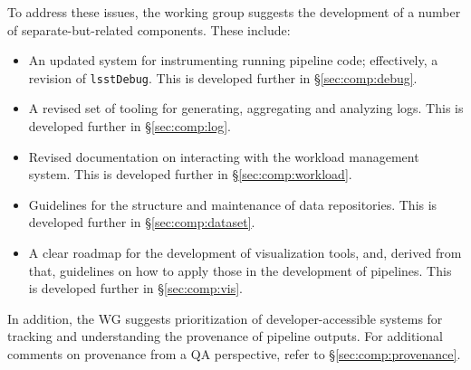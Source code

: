 \begin{itemize}
\end{itemize}

To address these issues, the working group suggests the development of a
number of separate-but-related components. These include:

\begin{itemize}

  \item{An updated system for instrumenting running pipeline code;
  effectively, a revision of \texttt{lsstDebug}. This is developed further in
  \S\ref{sec:comp:debug}.}

  \item{A revised set of tooling for generating, aggregating and analyzing
  logs. This is developed further in \S\ref{sec:comp:log}.}

  \item{Revised documentation on interacting with the workload management
  system. This is developed further in \S\ref{sec:comp:workload}.}

  \item{Guidelines for the structure and maintenance of data repositories.
  This is developed further in \S\ref{sec:comp:dataset}.}

  \item{A clear roadmap for the development of visualization tools, and,
  derived from that, guidelines on how to apply those in the development of
  pipelines. This is developed further in \S\ref{sec:comp:vis}.}

\end{itemize}

In addition, the WG suggests prioritization of developer-accessible
systems for tracking and understanding the \gls{provenance} of pipeline
outputs. For additional comments on provenance from a QA perspective, refer to
\S\ref{sec:comp:provenance}.
